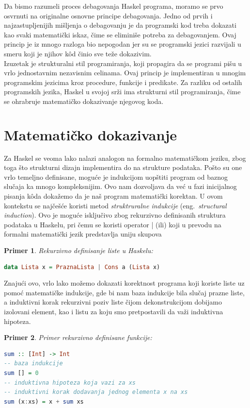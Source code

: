 \documentclass[a4paper]{article}
\newtheorem{primer}{Primer}[section]
\begin{document}
{{Da bismo razumeli proces debagovanja Haskel programa, moramo se prvo osvrnuti na originalne osnovne principe debagovanja. Jedno od prvih i najzastupljenijih mišljenja o debagovanju je da programski kod treba dokazati kao svaki matematički iskaz, čime se eliminiše potreba za debagovanjem. Ovaj princip je iz mnogo razloga bio nepogodan jer su se programski jezici razvijali u smeru koji je njihov k\^{o}d činio sve teže dokazivim\cite{pope2006declarative}. \\

Izuzetak je strukturalni stil programiranja, koji propagira da se programi pišu u vrlo jednostavnim nezavisnim celinama. Ovaj princip je implementiran u mnogim programskim jezicima kroz procedure, funkcije i predikate. Za razliku od ostalih programskih jezika, Haskel u svojoj srži ima strukturni stil programiranja, čime se ohrabruje matematičko dokazivanje njegovog koda\cite{pope2006declarative}.

\section{Matematičko dokazivanje}

Za Haskel se veoma lako nalazi analogon na formalno matematičkom jeziku, zbog toga što strukturni dizajn implementira do na strukture podataka. Pošto su one vrlo temeljno definisane, moguće je indukcijom uopštiti program od baznog slučaja ka mnogo kompleksnijim. Ovo nam dozvoljava da već u fazi inicijalnog pisanja k\^{o}da dokažemo da je naš program matematički korektan. U ovom kontekstu se najčešće koristi metod {\em struktruralne indukcije}  (eng.~{\em structural induction}). Ovo je moguće isključivo zbog rekurzivno definisanih struktura podataka u Haskelu, pri čemu se koristi operator | (ili) koji u prevodu na formalni matematički jezik predstavlja uniju skupova\cite{craftOfFuncProg}
\newpage
\begin{primer}
Rekurzivno definisanje liste u Haskelu:
\end{primer}
\begin{lstlisting}[language=Haskell,frame=single, label=simple]
data Lista x = PraznaLista | Cons a (Lista x)
\end{lstlisting}
Znajući ovo, vrlo lako možemo dokazati korektnost programa koji koriste liste uz pomoć matematičke indukcije, gde bi nam baza indukcije bila slučaj prazne liste, a induktivni korak rekurzivni poziv liste čijom dekonstrukcijom dobijamo izolovani element, kao i listu za koju smo pretpostavili da važi induktivna hipoteza.
\begin{primer}
Primer rekurzivno definisane funkcije:
\end{primer}
\begin{lstlisting}[language=Haskell,frame=single, label=simple]
sum :: [Int] -> Int
-- baza indukcije
sum [] = 0
-- induktivna hipoteza koja vazi za xs
-- induktivni korak dodavanja jednog elementa x na xs
sum (x:xs) = x + sum xs 
\end{lstlisting}


}}
\end{document}
